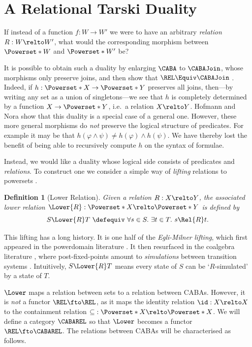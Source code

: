 \documentclass[10pt,a4paper]{article}
\newtheorem{definition}[theorem]{Definition}
\begin{document}
\section{A Relational Tarski Duality}\label{section:relational-tarski}

If instead of a function $f : W \to W'$ we were to have an arbitrary
\emph{relation} $R : W \relto W'$, what would the corresponding morphism between
$\Powerset*{W}$ and $\Powerset*{W'}$ be?

It is possible to obtain such a duality by enlarging $\CABA$ to $\CABAJoin$,
whose morphisms only preserve joins, and then show that $\REL \Equiv \CABAJoin$
\cite{jonsson_1951,scott_1980} \cite[\S 2.3]{kishida_2018}. Indeed, if $h :
\Powerset*{X} \to \Powerset*{Y}$ preserves all joins, then---by writing any set
as a union of singletons---we see that $h$ is completely determined by a
function $X \to \Powerset*{Y}$, i.e.\ a relation $X \relto Y$. Hofmann and Nora
\cite[\S 4.5]{hofmann_2015} show that this duality is a special case of a
general one. However, these more general morphisms do \emph{not} preserve the
logical structure of predicates. For example it may be that $h(\varphi \land
\psi) \neq h(\varphi) \land h(\psi)$. We have thereby lost the benefit of being
able to recursively compute $h$ on the syntax of formulae.

Instead, we would like a duality whose logical side consists of predicates and
\emph{relations}. To construct one we consider a simple way of \emph{lifting}
relations to powersets \cite{kurz_2016}.

\begin{definition}[Lower Relation]
  Given a relation \(R : X \relto Y\), the associated \emph{lower relation}
  \(\Lower{R} : \Powerset*{X} \relto \Powerset*{Y}\) is defined by
  \[
    S \Lower{R} T\ \defequiv\ \forall s \in S.\ \exists t \in T.\ s \Rel{R} t.
  \]
\end{definition}

This lifting has a long history. It is one half of the \emph{Egli-Milner
lifting}, which first appeared in the powerdomain literature
\cite{plotkin_1976,plotkin_1979}. It then resurfaced in the coalgebra literature
\cite{thijs_1996}, where post-fixed-points amount to \emph{simulations} between
transition systems \cite[\S 3]{jacobs_2016}. Intuitively, \(S \Lower{R} T\)
means every state of \(S\) can be `$R$-simulated' by a state of \(T\).

\(\Lower\) maps a relation between sets to a relation between CABAs. However, it
is \emph{not} a functor $\REL \fto \REL$, as it maps the identity relation \(\id :
X \relto X\) to the containment relation \(\mathbin{\subseteq} : \Powerset*{X}
\relto \Powerset*{X}\). We will define a category \(\CABAREL\) so that
\(\Lower\) becomes a functor \(\REL \fto \CABAREL\). The relations between CABAs
will be characterised as follows.
\end{document}
